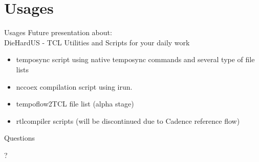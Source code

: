\documentclass[handout]{beamer}
\begin{document}
\section{Usages}
\begin{frame}{Usages}
	Future presentation about:\\
	\alert{DieHardUS - TCL Utilities and Scripts for your daily work}
	\begin{itemize}
	 \item temposync script using native temposync commands and several type of file lists
	 \item nccoex compilation script using irun.
	 \item tempoflow2TCL file list (alpha stage)
	 \item rtlcompiler scripts (will be discontinued due to Cadence reference flow)
	\end{itemize}
\end{frame}

\begin{frame}{Questions}
\centerline{{\huge ?}}
\end{frame}
\end{document}
